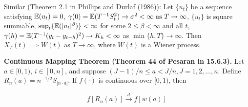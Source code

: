 Similar (Theorem 2.1 in  Phillips and Durlaf (1986)): Let \(\{u_t\}\) be a sequence satisfying \(\E(u_t) = 0\), \( \gamma(0) = \E(T^{-1}S_t ^2) \to \sigma^2 < \infty \text{ as } T \to \infty\), \(\{u_t\}\) is square summable, \(\sup_t \{ \E( |u_t|^\beta) \} < \infty\) for some \(2 \leq \beta < \infty\) and all \(t\), \(\gamma(h) = \E(T^{-1}(y_t - y_{t-h})^2) \to K_h < \infty\) as \(\min \{h, T\} \to \infty\). Then \(X_T(t) \implies W(t)\) as \(T \to \infty\), where \(W(t)\) is a Wiener process.

\begin{theorem}\label{stoch.cont.map} \textbf{Continuous Mapping Theorem (Theorem 44 of Pesaran in 15.6.3).} Let \(a \in [0, 1)\), \(i \in [0, n]\), and suppose \((J-1)/n \leq a < J/n, J = 1, 2, \ldots, n\). Define \(R_n(a) = n^{-1/2} S_{\big[ n \cdot a \big] }\). If \(f(\cdot)\) is continuous over \([0, 1)\), then 

\[
f[R_n(a)] \xrightarrow{d} f[w(a)]
\]

\end{theorem}


%
%
%
%
%
%
%
%
%
%

%